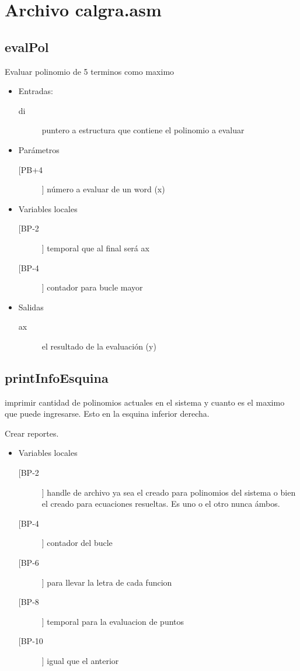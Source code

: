 \section{Archivo calgra.asm}
\label{sec-5}

\subsection{evalPol}
\label{sec-5-1}
Evaluar polinomio de 5 terminos como maximo
\begin{itemize}
\item Entradas:
\begin{description}
\item[di] puntero a estructura que contiene el
polinomio a evaluar
\end{description}
\item Parámetros
\begin{description}
\item[[PB+4]] número a evaluar de un word (x)
\end{description}
\item Variables locales
\begin{description}
\item[[BP-2]] temporal que al final será ax
\item[[BP-4]] contador para bucle mayor
\end{description}
\item Salidas
\begin{description}
\item[ax] el resultado de la evaluación (y)
\end{description}
\end{itemize}


\subsection{printInfoEsquina}
\label{sec-5-2}
imprimir cantidad de polinomios actuales en el sistema y
cuanto es el maximo que puede ingresarse. Esto en la
esquina inferior derecha.


Crear reportes.
\begin{itemize}
\item Variables locales
\begin{description}
\item[[BP-2]] handle de archivo ya sea el creado para
polinomios del sistema o bien el creado para
ecuaciones resueltas. Es uno o el otro nunca
ámbos.
\item[[BP-4]] contador del bucle
\item[[BP-6]] para llevar la letra de cada funcion
\item[[BP-8]] temporal para la evaluacion de puntos
\item[[BP-10]] igual que el anterior
\end{description}
\end{itemize}

